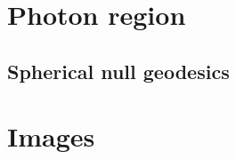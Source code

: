 
\section{Photon region} \label{s:gik:photon_region}

\subsection{Spherical null geodesics}

\section{Images}
